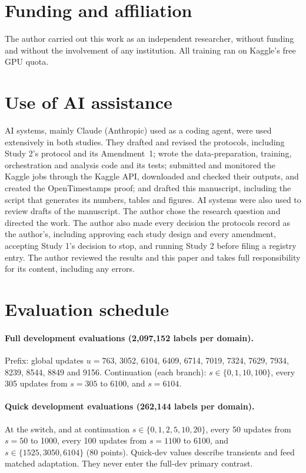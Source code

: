 \documentclass[11pt]{article}
\begin{document}
\section*{Funding and affiliation}
The author carried out this work as an independent researcher, without funding and without the involvement of
any institution. All training ran on Kaggle's free GPU quota.

\section*{Use of AI assistance}
AI systems, mainly Claude (Anthropic) used as a coding agent, were used extensively in both studies. They drafted
and revised the protocols, including Study 2's protocol and its Amendment~1; wrote the data-preparation, training,
orchestration and analysis code and its tests; submitted and monitored the Kaggle jobs through the Kaggle API,
downloaded and checked their outputs, and created the OpenTimestamps proof; and drafted this manuscript, including
the script that generates its numbers, tables and figures. AI systems were also used to review drafts of the
manuscript. The author chose the research question and directed the work. The author also made every decision the
protocols record as the author's, including approving each study design and every amendment, accepting Study 1's
decision to stop, and running Study 2 before filing a registry entry. The author reviewed the results and this
paper and takes full responsibility for its content, including any errors.

{\small
\setlength{\bibsep}{3pt plus 1pt}

}

\clearpage
\appendix

\section{Evaluation schedule}
\label{app:schedule}

\paragraph{Full development evaluations (2{,}097{,}152 labels per domain).} Prefix: global updates $u = 763$,
3052, 6104, 6409, 6714, 7019, 7324, 7629, 7934, 8239, 8544, 8849 and 9156. Continuation (each branch):
$s \in \{0, 1, 10, 100\}$, every 305 updates from $s = 305$ to 6100, and $s = 6104$.

\paragraph{Quick development evaluations (262{,}144 labels per domain).} At the switch, and at continuation
$s \in \{0, 1, 2, 5, 10, 20\}$, every 50 updates from $s = 50$ to 1000, every 100 updates from $s = 1100$ to
6100, and $s \in \{1525, 3050, 6104\}$ (80 points). Quick-dev values describe transients and feed matched
adaptation. They never enter the full-dev primary contrast.
\end{document}
